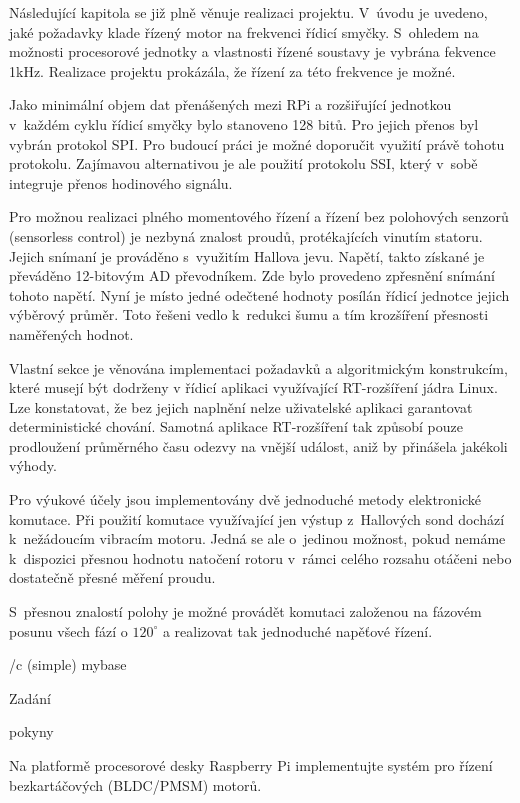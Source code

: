   Následující kapitola se již plně věnuje realizaci projektu. V~úvodu je uvedeno, jaké požadavky klade řízený motor na frekvenci řídicí smyčky. S~ohledem na možnosti procesorové jednotky a vlastnosti řízené soustavy je vybrána fekvence 1kHz. Realizace projektu prokázála, že řízení za této frekvence je možné. 
  
  Jako minimální objem dat přenášených mezi RPi a rozšiřující jednotkou v~každém cyklu řídicí smyčky bylo stanoveno 128 bitů. Pro jejich přenos byl vybrán protokol SPI. Pro budoucí práci je možné doporučit využití právě tohotu protokolu. Zajímavou alternativou je ale použití protokolu SSI, který v~sobě integruje přenos hodinového signálu.
  
  Pro možnou realizaci plného momentového řízení a řízení bez polohových senzorů (sensorless control) je nezbyná znalost proudů, protékajících vinutím statoru. Jejich snímaní je prováděno s~využitím Hallova jevu. Napětí, takto získané je převáděno 12-bitovým AD převodníkem. Zde bylo provedeno zpřesnění snímání tohoto napětí. Nyní je místo jedné odečtené hodnoty posílán řídicí jednotce jejich výběrový průměr. Toto řešeni vedlo k~redukci šumu a tím krozšíření přesnosti naměřených hodnot.
  
  Vlastní sekce je věnována implementaci požadavků a algoritmickým konstrukcím, které musejí být dodrženy v řídicí aplikaci využívající RT-rozšíření jádra Linux. Lze konstatovat, že bez jejich naplnění nelze uživatelské aplikaci garantovat deterministické chování. Samotná aplikace RT-rozšíření tak způsobí pouze prodloužení průměrného času odezvy na vnější událost, aniž by přinášela jakékoli výhody.
  
  Pro výukové účely jsou implementovány dvě jednoduché metody elektronické komutace. Při použití komutace využívající jen výstup z~Hallových sond dochází k~nežádoucím vibracím motoru. Jedná se ale o~jedinou možnost, pokud nemáme k~dispozici přesnou hodnotu natočení rotoru v~rámci celého rozsahu otáčeni nebo dostatečně přesné měření proudu.
  
   S~přesnou znalostí polohy je možné provádět komutaci založenou na fázovém posunu všech fází o $120^\circ$ a realizovat tak jednoduché napěťové řízení.
  
   
 

 \bibchap
 \usebib/c (simple) mybase

\app Zadání

 \sec pokyny
 
Na platformě procesorové desky Raspberry Pi implementujte systém pro řízení bezkartáčových (BLDC/PMSM) motorů.

